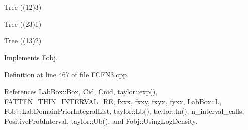 \-Tree ((12)3)

\-Tree ((23)1)

\-Tree ((13)2) 

\-Implements \hyperlink{classFobj_acf5ccd1fd7b302c8a1c77081b606a6ad}{\-Fobj}.



\-Definition at line 467 of file \-F\-C\-F\-N3.\-cpp.



\-References \-Lab\-Box\-::\-Box, \-Cid, \-Cnid, taylor\-::exp(), \-F\-A\-T\-T\-E\-N\-\_\-\-T\-H\-I\-N\-\_\-\-I\-N\-T\-E\-R\-V\-A\-L\-\_\-\-R\-E, fxxx, fxxy, fxyx, fyxx, \-Lab\-Box\-::\-L, \-Fobj\-::\-Lab\-Domain\-Prior\-Integral\-List, taylor\-::\-Lb(), taylor\-::ln(), n\-\_\-interval\-\_\-calls, \-Positive\-Prob\-Interval, taylor\-::\-Ub(), and \-Fobj\-::\-Using\-Log\-Density.


